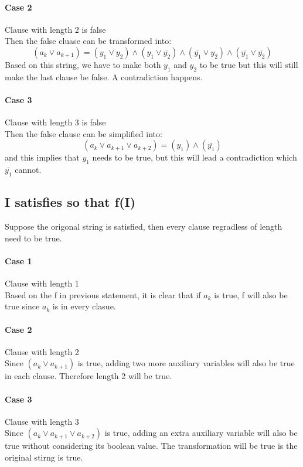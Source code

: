 \documentclass{article}
\begin{document}
\paragraph*{Case 2} Clause with length 2 is false \\
Then the false cluase can be transformed into:
$$(a_k \vee a_{k+1}) = (y_1 \vee y_2) \wedge (y_1 \vee \bar{y_2}) \wedge (\bar{y_1} \vee y_2) \wedge (\bar{y_1} \vee \bar{y_2})$$
Based on this string, we have to make both $y_1$ and $y_2$ to be true but this will still make the last clause be false. A contradiction happens.


\paragraph*{Case 3} Clause with length 3 is false \\
Then the false clause can be simplified into:
$$(a_k \vee a_{k+1} \vee a_{k+2}) = (y_1) \wedge (\bar{y_1})$$
and this implies that $y_1$ needs to be true, but this will lead a contradiction which $\bar{y_1}$ cannot.


\subsection*{I satisfies so that f(I)}
Suppose the origonal string is satisfied, then every clause regradless of length need to be true. 
\paragraph*{Case 1} Clause with length 1 \\
Based on the f in previous statement, it is clear that if $a_k$ is true, f will also be true since $a_k$ is in every clasue.

\paragraph*{Case 2} Clause with length 2 \\
Since $(a_k \vee a_{k+1})$ is true, adding two more auxiliary variables will also be true in each clause. Therefore length 2 will be true.

\paragraph*{Case 3} Clause with length 3 \\
Since $(a_k \vee a_{k+1} \vee a_{k+2})$ is true, adding an extra auxiliary variable will also be true without considering its boolean value.
The transformation will be true is the original stirng is true.
\end{document}
